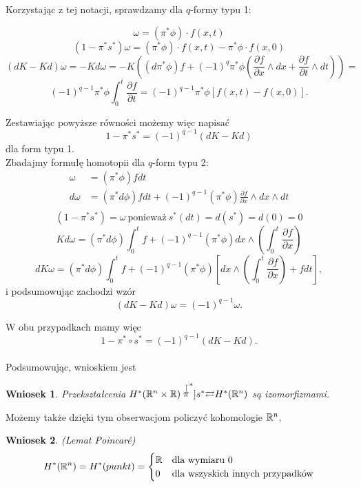 \documentclass[licencjacka]{pracamgr}
\theoremstyle{definition}
\theoremstyle{definition}
\theoremstyle{plain}
\theoremstyle{plain}
\theoremstyle{plain}
\theoremstyle{plain}
\newtheorem{wniosek}{Wniosek}[section]
\def\R{\ensuremath\mathbb{R}}
\begin{document}
Korzystając z tej notacji, sprawdzamy dla $q$-formy typu 1:

\[
    \omega = (\pi^\ast \phi) \cdot f(x,t)
\]
\[
    (1 - \pi^\ast s^\ast) \omega =
       (\pi^\ast \phi) \cdot f(x,t) - \pi^\ast \phi \cdot f(x,0)
\]
\[
    (dK - Kd) \omega = - K d\omega = 
    -K \left(
    (d \pi^\ast \phi)f +
    (-1)^q \pi^\ast \phi \left(
       \frac{\partial f}{\partial x} \wedge dx +
       \frac{\partial f}{\partial t} \wedge dt
       \right)
    \right) =
\]
\[
    (-1)^{q-1}\pi^\ast \phi \int_0^t \frac{\partial f}{\partial t}
    = (-1)^{q-1} \pi^\ast \phi [f(x,t) - f(x,0)].
\]

Zestawiając powyższe równości możemy więc napisać
\[
    1 - \pi^\ast s^\ast = (-1)^{q-1}(dK - Kd)
\]
dla form typu 1. \\

Zbadajmy formułę homotopii dla $q$-form typu 2:
\begin{align*}
     \omega &= (\pi^\ast \phi)f dt \\
    d\omega &= (\pi^\ast d \phi)f dt + 
      (-1)^{q-1}(\pi^\ast \phi) \frac{\partial f}{\partial x} 
        \wedge dx \wedge dt \\
\end{align*}
\[
    (1 - \pi^\ast s^\ast) = \omega ~\text{ponieważ}~
     s^\ast(dt) = d(s^\ast) = d(0) = 0
\]
\[
    Kd\omega = (\pi^\ast d\phi) \int_0^tf +
      (-1)^{q-1} (\pi^\ast \phi)
          dx \wedge (\int_0^t \frac{\partial f}{\partial x})
\]
\[
    dK\omega = (\pi^\ast d\phi) \int_0^tf +
      (-1)^{q-1} (\pi^\ast \phi)
      \left[
          dx \wedge (\int_0^t \frac{\partial f}{\partial x})
          + f dt
      \right],
\]
i podsumowując zachodzi wzór
\[
    (dK - Kd) \omega = (-1)^{q-1} \omega.
\]

W obu przypadkach mamy więc 
\[
1 - \pi^\ast \circ s^\ast = (-1)^{q-1}(dK - Kd).
\] \\

Podsumowując, wnioskiem jest 
\begin{wniosek}
Przekształcenia $H^\ast (\R^n \times \R)
\stackrel[\pi^\ast]{s^\ast}{\rightleftarrows} H^\ast(\R^n)$ są izomorfizmami.
\end{wniosek}
Możemy także dzięki tym obserwacjom policzyć kohomologie $\R^n$.
\begin{wniosek}(Lemat Poincaré)
\[
H^\ast(\R^n) = H^\ast(punkt) = 
\begin{cases}
\R & \text{dla wymiaru 0} \\
0 & \text{dla wszyskich innych przypadków} \\
\end{cases}
\]
\end{wniosek} 
\end{document}
